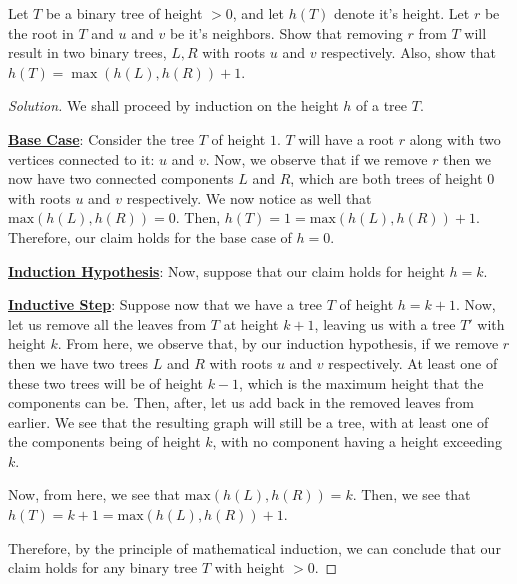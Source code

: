 \documentclass{article}
\newenvironment{solution}{\begin{proof}[Solution]}{\end{proof}}
\begin{document}
\begin{hw}
	Let $T$ be a binary tree of height $> 0$, and let $h(T)$ denote it's height. Let $r$ be the root in $T$ and $u$ and $v$ be it's neighbors. Show that removing $r$ from $T$ will result in two binary trees, $L,R$ with roots $u$ and $v$ respectively. Also, show that $h(T) = \max(h(L),h(R)) + 1$.
\end{hw}
\begin{solution}
	We shall proceed by induction on the height $h$ of a tree $T$.
	
	\textbf{\underline{Base Case}}: Consider the tree $T$ of height $1$. $T$ will have a root $r$ along with two vertices connected to it: $u$ and $v$. Now, we observe that if we remove $r$ then we now have two connected components $L$ and $R$, which are both trees of height $0$ with roots $u$ and $v$ respectively. We now notice as well that $\mathrm{max}(h(L), h(R)) = 0$. Then, $h(T) = 1 = \mathrm{max}(h(L), h(R)) + 1$. Therefore, our claim holds for the base case of $h=0$.
	
	\textbf{\underline{Induction Hypothesis}}: Now, suppose that our claim holds for height $h=k$.
	
	\textbf{\underline{Inductive Step}}: Suppose now that we have a tree $T$ of height $h=k+1$. Now, let us remove all the leaves from $T$ at height $k+1$, leaving us with a tree $T'$ with height $k$. From here, we observe that, by our induction hypothesis, if we remove $r$ then we have two trees $L$ and $R$ with roots $u$ and $v$ respectively. At least one of these two trees will be of height $k-1$, which is the maximum height that the components can be. Then, after, let us add back in the removed leaves from earlier. We see that the resulting graph will still be a tree, with at least one of the components being of height $k$, with no component having a height exceeding $k$.
	
	Now, from here, we see that $\mathrm{max} (h(L), h(R)) = k$. Then, we see that $h(T) = k+1 = \mathrm{max} (h(L), h(R)) + 1$.
	
	Therefore, by the principle of mathematical induction, we can conclude that our claim holds for any binary tree $T$ with height $> 0$.
\end{solution}
\end{document}
